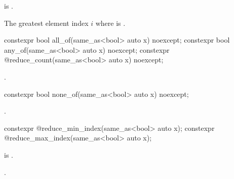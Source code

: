 \begin{itemdescr}
  \pnum\expects
   is .

  \pnum\returns
  The greatest element index $i$ where  is .
\end{itemdescr}

\begin{itemdecl}
constexpr bool all_of(same_as<bool> auto x) noexcept;
constexpr bool any_of(same_as<bool> auto x) noexcept;
constexpr @\simdsizetype@ reduce_count(same_as<bool> auto x) noexcept;
\end{itemdecl}
\begin{itemdescr}
  \pnum\returns {}.
\end{itemdescr}

\begin{itemdecl}
constexpr bool none_of(same_as<bool> auto x) noexcept;
\end{itemdecl}
\begin{itemdescr}
  \pnum\returns {}.
\end{itemdescr}

\begin{itemdecl}
constexpr @\simdsizetype@ reduce_min_index(same_as<bool> auto x);
constexpr @\simdsizetype@ reduce_max_index(same_as<bool> auto x);
\end{itemdecl}

\begin{itemdescr}
  \pnum\expects {} is .

  \pnum\returns {}.
\end{itemdescr}

